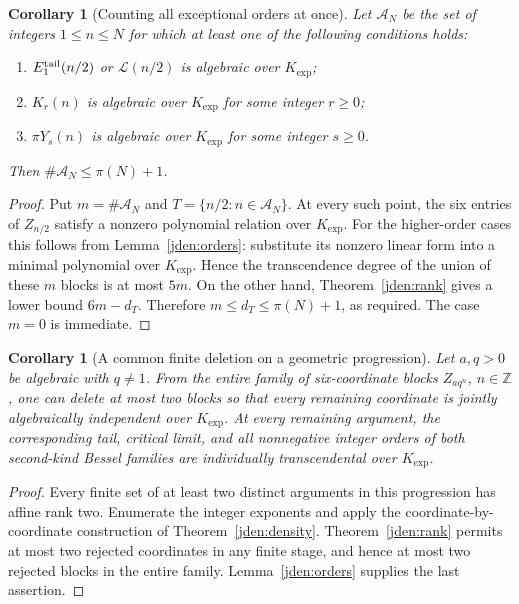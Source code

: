 \documentclass[11pt]{article}
\newtheorem{corollary}[theorem]{Corollary}
\theoremstyle{definition}
\theoremstyle{remark}
\newcommand{\Kexp}{K_{\mathrm{exp}}}
\begin{document}
\begin{corollary}[Counting all exceptional orders at once]
\label{jden:badcount}
Let $\mathcal A_N$ be the set of integers $1\le n\le N$ for which
at least one of the following conditions holds:
\begin{enumerate}
\item $E_1^{\rm tail}(n/2)$ or $\mathcal L(n/2)$ is algebraic over $\Kexp$;
\item $K_r(n)$ is algebraic over $\Kexp$ for some integer $r\ge0$;
\item $\pi Y_s(n)$ is algebraic over $\Kexp$ for some integer $s\ge0$.
\end{enumerate}
Then $\#\mathcal A_N\le\pi(N)+1$.
\end{corollary}

\begin{proof}
Put $m=\#\mathcal A_N$ and
$T=\{n/2:n\in\mathcal A_N\}$. At every such point, the six entries
of $Z_{n/2}$ satisfy a nonzero polynomial relation over $\Kexp$.
For the higher-order cases this follows from
Lemma~\ref{jden:orders}: substitute its nonzero linear form into a
minimal polynomial over $\Kexp$. Hence the transcendence degree of
the union of these $m$ blocks is at most $5m$. On the other hand,
Theorem~\ref{jden:rank} gives a lower bound $6m-d_T$. Therefore
$m\le d_T\le\pi(N)+1$, as required. The case $m=0$ is immediate.
\end{proof}

\begin{corollary}[A common finite deletion on a geometric progression]
\label{jden:geometric}
Let $a,q>0$ be algebraic with $q\ne1$. From the entire family of
six-coordinate blocks $Z_{aq^n}$, $n\in\mathbb Z$, one can delete
at most two blocks so that every remaining coordinate is jointly
algebraically independent over $\Kexp$. At every remaining argument,
the corresponding tail, critical limit, and all nonnegative integer
orders of both second-kind Bessel families are individually
transcendental over $\Kexp$.
\end{corollary}

\begin{proof}
Every finite set of at least two distinct arguments in this progression
has affine rank two. Enumerate the integer exponents and apply the
coordinate-by-coordinate construction of Theorem~\ref{jden:density}.
Theorem~\ref{jden:rank} permits at most two rejected coordinates in
any finite stage, and hence at most two rejected blocks in the entire
family. Lemma~\ref{jden:orders} supplies the last assertion.
\end{proof}
\end{document}
